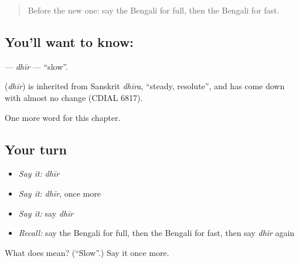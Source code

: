 \label{lesson:BN-C135-dhir}



\begin{quote}
Before the new one: say the Bengali for full, then the Bengali for fast.
\end{quote}

\subsection*{You'll want to know: }
\textbf{} — \emph{dhīr} — \textquotedblleft{}slow\textquotedblright{}.

\begin{cousinweb}
\textbf{} (\emph{dhīr}) is inherited from Sanskrit \emph{dhīra}, \textquotedblleft{}steady, resolute\textquotedblright{}, and has come down with almost no change (CDIAL 6817).
\end{cousinweb}

\begin{grammarlens}[title={What you've built}]
One more word for this chapter.
\end{grammarlens}

\subsection*{Your turn}
\begin{itemize}
\raggedright
  \item \emph{Say it:} \emph{dhīr}
  \item \emph{Say it:} \emph{dhīr}, once more
  \item \emph{Say it:} say \emph{dhīr}
  \item \emph{Recall:} say the Bengali for full, then the Bengali for fast, then say \emph{dhīr} again
\end{itemize}

\begin{tcolorbox}[breakable,colback=teal!4,colframe=teal!35!black,title={Before you move on}]
What does  mean? (\textquotedblleft{}Slow\textquotedblright{}.) Say it once more.
\end{tcolorbox}

